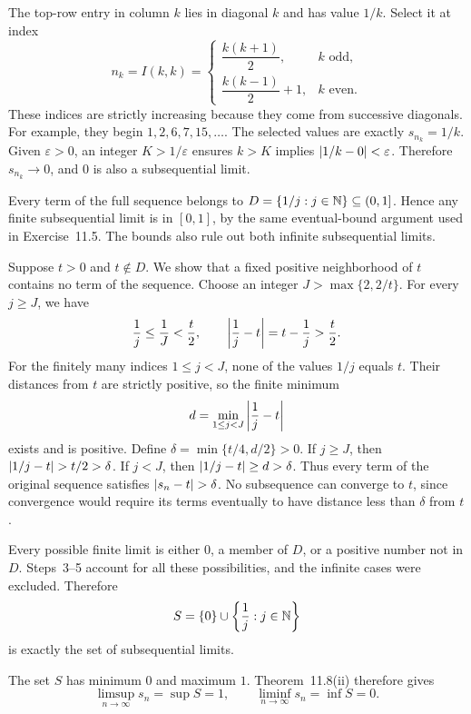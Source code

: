 The top-row entry in column $k$ lies in diagonal $k$ and has
value $1/k$. Select it at index
\[
 n_k=I(k,k)=
 \begin{cases}
 \dfrac{k(k+1)}2,&k\text{ odd},\\[4pt]
 \dfrac{k(k-1)}2+1,&k\text{ even}.
 \end{cases}
\]
These indices are strictly increasing because they come from
successive diagonals. For example, they begin $1,2,6,7,15,\ldots$.
The selected values are exactly $s_{n_k}=1/k$.
Given $\varepsilon>0$, an integer $K>1/\varepsilon$ ensures
$k>K$ implies $\left|1/k-0\right|<\varepsilon$.
Therefore $s_{n_k}\to0$, and $0$ is also a subsequential limit.

Every term of the full sequence belongs to
$D=\{1/j:j\in\mathbb{N}\}\subseteq(0,1]$.
Hence any finite subsequential limit is in $[0,1]$, by the
same eventual-bound argument used in Exercise~11.5.
The bounds also rule out both infinite subsequential limits.

Suppose $t>0$ and $t\notin D$. We show that a fixed positive
neighborhood of $t$ contains no term of the sequence.
Choose an integer $J>\max\{2,2/t\}$.
For every $j\ge J$, we have
\[
 \frac1j\le\frac1J<\frac t2,
 \qquad \left|\frac1j-t\right|=t-\frac1j>\frac t2.
\]
For the finitely many indices $1\le j<J$, none of the values
$1/j$ equals $t$. Their distances from $t$ are strictly positive,
so the finite minimum
\[
 d=\min_{1\le j<J}\left|\frac1j-t\right|
\]
exists and is positive. Define
$\delta=\min\{t/4,d/2\}>0$.
If $j\ge J$, then $\abs{1/j-t}>t/2>\delta$.
If $j<J$, then $\left|1/j-t\right|\ge d>\delta$.
Thus every term of the original sequence satisfies
$\abs{s_n-t}>\delta$.
No subsequence can converge to $t$, since convergence would require
its terms eventually to have distance less than $\delta$ from $t$.

Every possible finite limit is either $0$, a member of $D$, or
a positive number not in $D$. Steps~3--5 account for all these
possibilities, and the infinite cases were excluded. Therefore
\[
 S=\{0\}\cup\left\{\frac1j:j\in\mathbb{N}\right\}
\]
is exactly the set of subsequential limits.

The set $S$ has minimum $0$ and maximum $1$.
Theorem~11.8(ii) therefore gives
\[
 \limsup_{n\to\infty}s_n=\sup S=1,
 \qquad \liminf_{n\to\infty}s_n=\inf S=0.
\]


